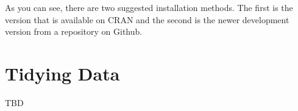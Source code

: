\documentclass[
]{book}
\begin{document}
As you can see, there are two suggested installation methods. The first is the version that is available on CRAN and the second is the newer development version from a repository on Github.

\hypertarget{tidy-data}{%
\chapter{Tidying Data}\label{tidy-data}}

TBD

  
\end{document}
